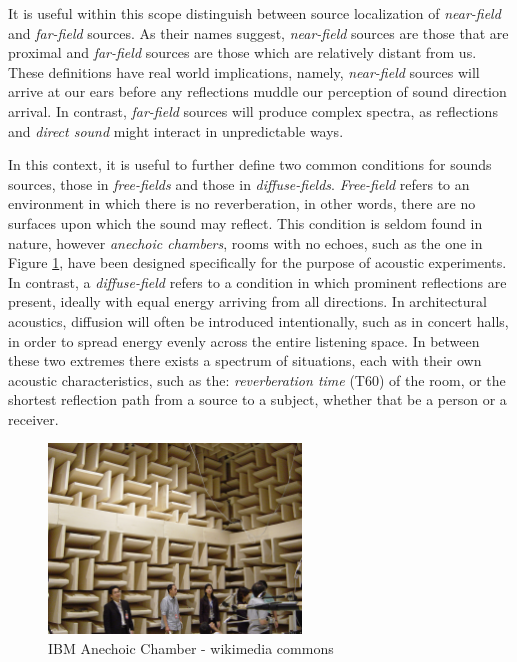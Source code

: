 It is useful within this scope distinguish between source localization of \textit{near-field} and \textit{far-field} sources. As their names suggest, \textit{near-field} sources are those that are proximal and \textit{far-field} sources are those which are relatively distant from us. These definitions have real world implications, namely, \textit{near-field} sources will arrive at our ears before any reflections muddle our perception of sound direction arrival. In contrast, \textit{far-field} sources will produce complex spectra, as reflections and \textit{direct sound} might interact in unpredictable ways. 

In this context, it is useful to further define two common conditions for sounds sources, those in \textit{free-fields} and those in \textit{diffuse-fields}. \textit{Free-field} refers to an environment in which there is no reverberation, in other words, there are no surfaces upon which the sound may reflect. This condition is seldom found in nature, however \textit{anechoic chambers}, rooms with no echoes, such as the one in Figure \ref{fig:ibm-anechoic}, have been designed specifically for the purpose of acoustic experiments. In contrast, a \textit{diffuse-field} refers to a condition in which prominent reflections are present, ideally with equal energy arriving from all directions. In architectural acoustics, diffusion will often be introduced intentionally, such as in concert halls, in order to spread energy evenly across the entire listening space. In between these two extremes there exists a spectrum of situations, each with their own acoustic characteristics, such as the: \textit{reverberation time} (T60) of the room, or the shortest reflection path from a source to a subject, whether that be a person or a receiver.

\begin{figure}[ht!]%
\centering
\includegraphics[width=0.6\textwidth]{img/ibm-anechoic.jpg} 
\caption{IBM Anechoic Chamber - wikimedia commons}
\label{fig:ibm-anechoic}
\end{figure}

